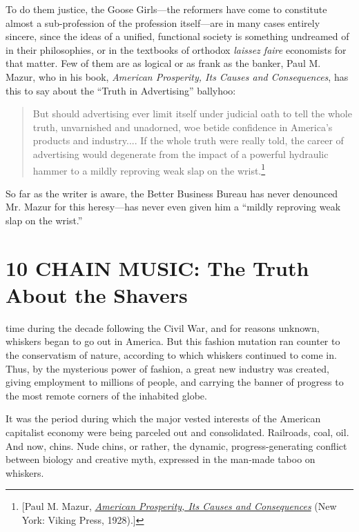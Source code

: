 \documentclass[nohyper,openany,nobib]{tufte-book}
\let\oldchapter\chapter
\def\chapter{%
  \setcounter{footnote}{0}%
  \oldchapter
}
\begin{document}
To do them justice, the Goose Girls---the reformers have come to
constitute almost a sub-profession of the profession itself---are in
many cases entirely sincere, since the ideas of a unified, functional
society is something undreamed of in their philosophies, or in the
textbooks of orthodox \emph{laissez faire} economists for that matter.
Few of them are as logical or as frank as the banker, Paul M. Mazur, who
in his book, \emph{American Prosperity, Its Causes and Consequences},
has this to say about the ``Truth in Advertising'' ballyhoo:

\begin{quote}
But should advertising ever limit itself under judicial oath to tell the
whole truth, unvarnished and unadorned, woe betide confidence in
America's products and industry.... If the whole truth were really told,
the career of advertising would degenerate from the impact of a powerful
hydraulic hammer to a mildly reproving weak slap on the wrist.\footnote{{[}Paul M. Mazur,
  \emph{\href{https://www.worldcat.org/title/american-prosperity-its-causes-and-consequences/oclc/289643}{American
  Prosperity, Its Causes and Consequences}} (New York: Viking Press,
  1928).{]}}
\end{quote}

So far as the writer is aware, the Better Business Bureau has never
denounced Mr. Mazur for this heresy---has never even given him a
``mildly reproving weak slap on the wrist.''


\chapter[10 \hspace*{1mm} CHAIN MUSIC: The Truth About the Shavers]{10 CHAIN MUSIC: The Truth About the Shavers}

 time during the decade following the Civil War, and for reasons
unknown, whiskers began to go out in America. But this fashion mutation
ran counter to the conservatism of nature, according to which whiskers
continued to come in. Thus, by the mysterious power of fashion, a great
new industry was created, giving employment to millions of people, and
carrying the banner of progress to the most remote corners of the
inhabited globe.

It was the period during which the major vested interests of the
American capitalist economy were being parceled out and consolidated.
Railroads, coal, oil. And now, chins. Nude chins, or rather, the
dynamic, progress-generating conflict between biology and creative myth,
expressed in the man-made taboo on whiskers.
\end{document}
